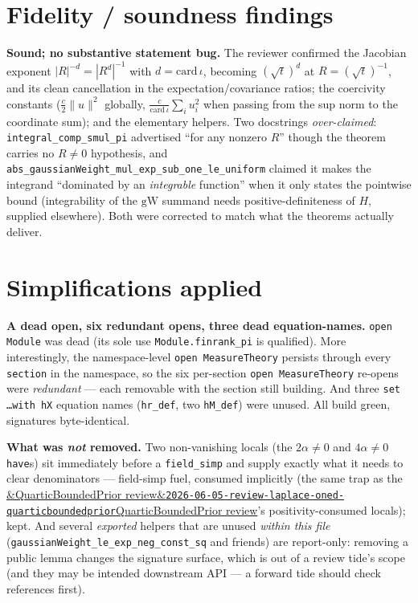 \documentclass[11pt]{article}
\newcommand{\reviewref}[2][]{\href{https://therisensea.org/reviews/#2/}{\ifx&#1&\texttt{#2}\else#1\fi}}
\begin{document}
\section{Fidelity / soundness findings}
\textbf{Sound; no substantive statement bug.} The reviewer confirmed the Jacobian exponent
$|R|^{-d}=|R^{d}|^{-1}$ with $d=\mathrm{card}\,\iota$, becoming $(\sqrt t)^{d}$ at $R=(\sqrt t)^{-1}$,
and its clean cancellation in the expectation/covariance ratios; the coercivity constants
($\tfrac{c}{2}\|u\|^2$ globally, $\tfrac{c}{\mathrm{card}\,\iota}\sum_i u_i^2$ when passing from the sup
norm to the coordinate sum); and the elementary helpers. Two docstrings \emph{over-claimed}:
\texttt{integral\_comp\_smul\_pi} advertised ``for any nonzero $R$'' though the theorem carries no
$R\ne0$ hypothesis, and \texttt{abs\_gaussianWeight\_mul\_exp\_sub\_one\_le\_uniform} claimed it makes
the integrand ``dominated by an \emph{integrable} function'' when it only states the pointwise bound
(integrability of the $\mathrm{gW}$ summand needs positive-definiteness of $H$, supplied elsewhere).
Both were corrected to match what the theorems actually deliver.

\section{Simplifications applied}
\textbf{A dead open, six redundant opens, three dead equation-names.} \texttt{open Module} was dead
(its sole use \texttt{Module.finrank\_pi} is qualified). More interestingly, the namespace-level
\texttt{open MeasureTheory} persists through every \texttt{section} in the namespace, so the six
per-section \texttt{open MeasureTheory} re-opens were \emph{redundant} --- each removable with the
section still building. And three \texttt{set \dots with hX} equation names (\texttt{hr\_def}, two
\texttt{hM\_def}) were unused. All build green, signatures byte-identical.

\textbf{What was \emph{not} removed.} Two non-vanishing locals (the $2\alpha\ne0$ and $4\alpha\ne0$
\texttt{have}s) sit immediately before a \texttt{field\_simp} and supply exactly what it needs to
clear denominators --- field-simp fuel, consumed implicitly (the same trap as the
\reviewref[QuarticBoundedPrior review]{2026-06-05-review-laplace-oned-quarticboundedprior}'s
positivity-consumed locals); kept. And several \emph{exported} helpers that are unused \emph{within
this file} (\texttt{gaussianWeight\_le\_exp\_neg\_const\_sq} and friends) are report-only: removing a
public lemma changes the signature surface, which is out of a review tide's scope (and they may be
intended downstream API --- a forward tide should check references first).
\end{document}
